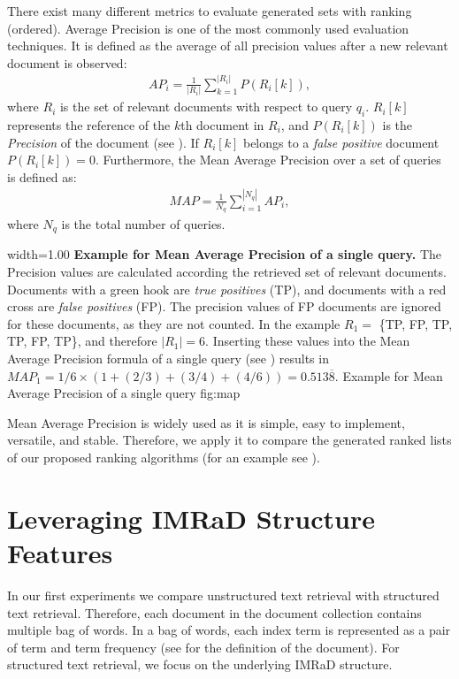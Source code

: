 There exist many different metrics to evaluate generated sets with ranking (ordered). Average Precision is one of the most commonly used evaluation techniques. It is defined as the average of all precision values after a new relevant document is observed:
\begin{align}
  \label{map_of_a_single_query}
  \mathit{AP}_i = \frac{1}{|R_i|}\sum_{k = 1}^{|R_i|} P(R_i[k]),
\end{align}
where $R_i$ is the set of relevant documents with respect to query $q_i$. $R_i[k]$ represents the reference of the $k$th document in $R_i$, and $P(R_i[k])$ is the \textit{Precision} of the document (see ). If $R_i[k]$ belongs to a \textit{false positive} document $P(R_i[k]) = 0$. Furthermore, the Mean Average Precision over a set of queries is defined as:
\begin{align}
  \mathit{MAP} = \frac{1}{N_q}\sum_{i = 1}^{|N_q|} \mathit{AP}_i,
\end{align}
where $N_q$ is the total number of queries.

      {width=1.00\textwidth}
      {\textbf{Example for Mean Average Precision of a single query.} The Precision values are calculated according the retrieved set of relevant documents. Documents with a green hook are \textit{true positives} (TP), and documents with a red cross are \textit{false positives} (FP). The precision values of FP documents are ignored for these documents, as they are not counted. In the example $R_1 =$ \{TP, FP, TP, TP, FP, TP\}, and therefore $|R_1| = 6$. Inserting these values into the Mean Average Precision formula of a single query (see ) results in $\mathit{MAP}_1 = 1/6 \times (1 + (2/3) + (3/4) + (4/6)) = 0.513\overline{8}$.}
      {Example for Mean Average Precision of a single query}
      {fig:map}

 Mean Average Precision is widely used as it is simple, easy to implement, versatile, and stable. Therefore, we apply it to compare the generated ranked lists of our proposed ranking algorithms (for an example see ).


\section{Leveraging IMRaD Structure Features}
\label{sec:leveraging_imrad_structure_features}

In our first experiments we compare unstructured text retrieval with structured text retrieval. Therefore, each document in the document collection contains multiple bag of words. In a bag of words, each index term is represented as a pair of term and term frequency (see  for the definition of the document). For structured text retrieval, we focus on the underlying IMRaD structure.


